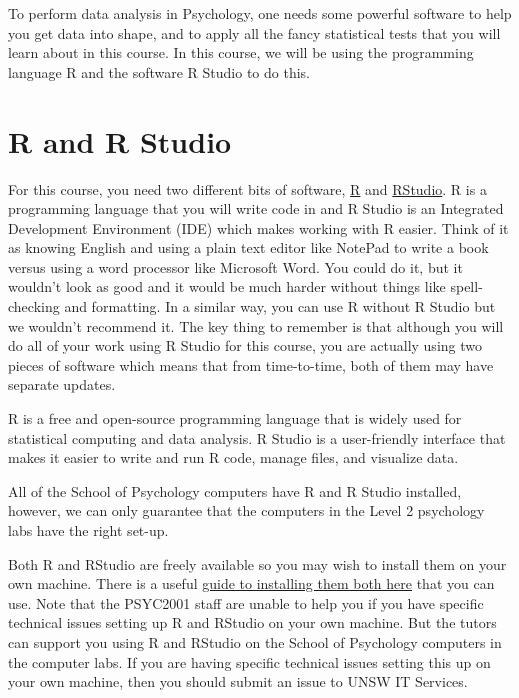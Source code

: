 \documentclass[
]{book}
\begin{document}
To perform data analysis in Psychology, one needs some powerful software to help you get data into shape, and to apply all the fancy statistical tests that you will learn about in this course. In this course, we will be using the programming language R and the software R Studio to do this.

\section{R and R Studio}\label{r-and-r-studio}

For this course, you need two different bits of software, \href{https://www.r-project.org/}{R} and \href{https://www.rstudio.com/products/rstudio/download/\#download}{RStudio}. R is a programming language that you will write code in and R Studio is an Integrated Development Environment (IDE) which makes working with R easier. Think of it as knowing English and using a plain text editor like NotePad to write a book versus using a word processor like Microsoft Word. You could do it, but it wouldn't look as good and it would be much harder without things like spell-checking and formatting. In a similar way, you can use R without R Studio but we wouldn't recommend it. The key thing to remember is that although you will do all of your work using R Studio for this course, you are actually using two pieces of software which means that from time-to-time, both of them may have separate updates.

R is a free and open-source programming language that is widely used for statistical computing and data analysis. R Studio is a user-friendly interface that makes it easier to write and run R code, manage files, and visualize data.

All of the School of Psychology computers have R and R Studio installed, however, we can only guarantee that the computers in the Level 2 psychology labs have the right set-up.

Both R and RStudio are freely available so you may wish to install them on your own machine. There is a useful \href{https://psyteachr.github.io/hack-your-data/r_instructions.html}{guide to installing them both here} that you can use. Note that the PSYC2001 staff are unable to help you if you have specific technical issues setting up R and RStudio on your own machine. But the tutors can support you using R and RStudio on the School of Psychology computers in the computer labs. If you are having specific technical issues setting this up on your own machine, then you should submit an issue to UNSW IT Services.
\end{document}

